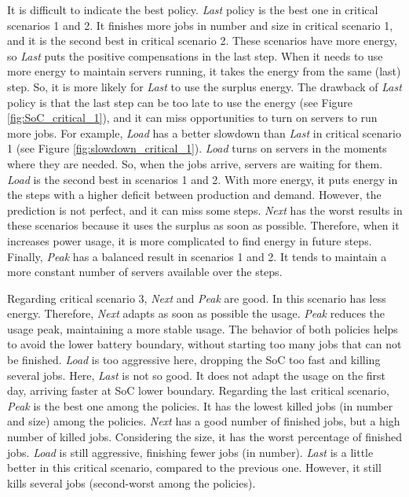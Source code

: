 It is difficult to indicate the best policy. \emph{Last} policy is the best one in critical scenarios 1 and 2. It finishes more jobs in number and size in critical scenario 1, and it is the second best in critical scenario 2. These scenarios have more energy, so \emph{Last} puts the positive compensations in the last step. When it needs to use more energy to maintain servers running, it takes the energy from the same (last) step. So, it is more likely for \emph{Last} to use the surplus energy. The drawback of \emph{Last} policy is that the last step can be too late to use the energy (see Figure \ref{fig:SoC_critical_1}), and it can miss opportunities to turn on servers to run more jobs. For example, \emph{Load} has a better slowdown than \emph{Last} in critical scenario 1 (see Figure \ref{fig:slowdown_critical_1}). \emph{Load} turns on servers in the moments where they are needed. So, when the jobs arrive, servers are waiting for them. \emph{Load} is the second best in scenarios 1 and 2. With more energy, it puts energy in the steps with a higher deficit between production and demand. However, the prediction is not perfect, and it can miss some steps. \emph{Next} has the worst results in these scenarios because it uses the surplus as soon as possible. Therefore, when it increases power usage, it is more complicated to find energy in future steps. Finally, \emph{Peak} has a balanced result in scenarios 1 and 2. It tends to maintain a more constant number of servers available over the steps. 

Regarding critical scenario 3, \emph{Next} and \emph{Peak} are good. In this scenario has less energy. Therefore, \emph{Next} adapts as soon as possible the usage. \emph{Peak} reduces the usage peak, maintaining a more stable usage. The behavior of both policies helps to avoid the lower battery boundary, without starting too many jobs that can not be finished. \emph{Load} is too aggressive here, dropping the SoC too fast and killing several jobs. Here, \emph{Last} is not so good. It does not adapt the usage on the first day, arriving faster at SoC lower boundary. Regarding the last critical scenario, \emph{Peak} is the best one among the policies. It has the lowest killed jobs (in number and size) among the policies. \emph{Next} has a good number of finished jobs, but a high number of killed jobs. Considering the size, it has the worst percentage of finished jobs. \emph{Load} is still aggressive, finishing fewer jobs (in number). \emph{Last} is a little better in this critical scenario, compared to the previous one. However, it still kills several jobs (second-worst among the policies). 

